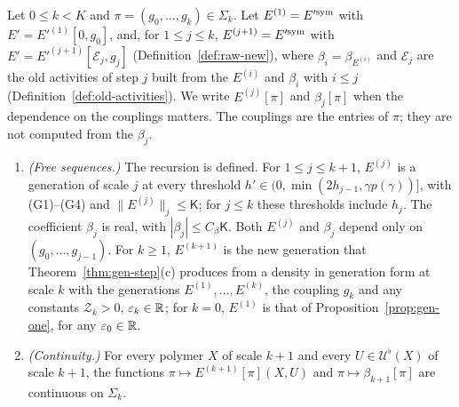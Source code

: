 \begin{proposition}\label{prop:flow-continuity}
Let $0\le k<K$ and $\pi=(g_0,\dots,g_k)\in\Sigma_k$. Let $E^{(1)}=E'^{\rm sym}$ with $E'=E'^{(1)}[0,g_0]$, and, for $1\le j\le k$, $E^{(j+1)}=E'^{\rm sym}$ with $E'=E'^{(j+1)}[\mathcal E_j,g_j]$ (Definition~\ref{def:raw-new}), where $\beta_i=\beta_{E^{(i)}}$ and $\mathcal E_j$ are the old activities of step $j$ built from the $E^{(i)}$ and $\beta_i$ with $i\le j$ (Definition~\ref{def:old-activities}). We write $E^{(j)}[\pi]$ and $\beta_j[\pi]$ when the dependence on the couplings matters. The couplings are the entries of $\pi$; they are not computed from the $\beta_j$.
\begin{enumerate}[label=(\alph*)]
\item \emph{(Free sequences.)} The recursion is defined. For $1\le j\le k+1$, $E^{(j)}$ is a generation of scale $j$ at every threshold $h'\in(0,\min(2h_{j-1},\gamma p(\gamma))]$, with (G1)--(G4) and $\|E^{(j)}\|_j\le\mathsf K$; for $j\le k$ these thresholds include $h_j$. The coefficient $\beta_j$ is real, with $|\beta_j|\le C_\beta\mathsf K$. Both $E^{(j)}$ and $\beta_j$ depend only on $(g_0,\dots,g_{j-1})$. For $k\ge1$, $E^{(k+1)}$ is the new generation that Theorem~\ref{thm:gen-step}(c) produces from a density in generation form at scale $k$ with the generations $E^{(1)},\dots,E^{(k)}$, the coupling $g_k$ and any constants $\mathcal Z_k>0$, $\varepsilon_k\in\mathbb R$; for $k=0$, $E^{(1)}$ is that of Proposition~\ref{prop:gen-one}, for any $\varepsilon_0\in\mathbb R$.
\item \emph{(Continuity.)} For every polymer $X$ of scale $k+1$ and every $U\in\mathcal U^\flat(X)$ of scale $k+1$, the functions $\pi\mapsto E^{(k+1)}[\pi](X,U)$ and $\pi\mapsto\beta_{k+1}[\pi]$ are continuous on $\Sigma_k$.
\end{enumerate}
\end{proposition}

